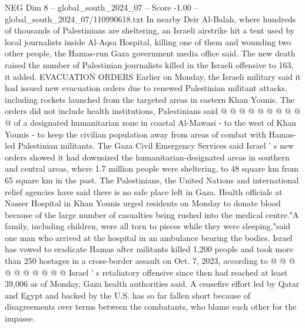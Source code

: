 \begin{textsample}{NEG Dim 8 – global\_south\_2024\_07 – Score -1.00 – global\_south\_2024\_07/110990618.txt}
In nearby Deir Al-Balah, where hundreds of thousands of Palestinians are sheltering, an Israeli airstrike hit a tent used by local journalists inside Al-Aqsa Hospital, killing one of them and wounding two other people, the Hamas-run Gaza government media office said.
The new death raised the number of Palestinian journalists killed in the Israeli offensive to 163, it added.
EVACUATION ORDERS Earlier on Monday, the Israeli military said it had issued new evacuation orders due to renewed Palestinian militant attacks, including rockets launched from the targeted areas in eastern Khan Younis.
The orders did not include health institutions, Palestinians said @ @ @ @ @ @ @ @ @ @ of a designated humanitarian zone in coastal Al-Mawasi - to the west of Khan Younis - to keep the civilian population away from areas of combat with Hamas-led Palestinian militants.
The Gaza Civil Emergency Services said Israel ' s new orders showed it had downsized the humanitarian-designated areas in southern and central areas, where 1.7 million people were sheltering, to 48 square km from 65 square km in the past.
The Palestinians, the United Nations and international relief agencies have said there is no safe place left in Gaza.
Health officials at Nasser Hospital in Khan Younis urged residents on Monday to donate blood because of the large number of casualties being rushed into the medical centre."A family, including children, were all torn to pieces while they were sleeping,"said one man who arrived at the hospital in an ambulance bearing the bodies.
Israel has vowed to eradicate Hamas after militants killed 1,200 people and took more than 250 hostages in a cross-border assault on Oct. 7, 2023, according to @ @ @ @ @ @ @ @ @ @ Israel ' s retaliatory offensive since then had reached at least 39,006 as of Monday, Gaza health authorities said.
A ceasefire effort led by Qatar and Egypt and backed by the U.S. has so far fallen short because of disagreements over terms between the combatants, who blame each other for the impasse.

\end{textsample}
